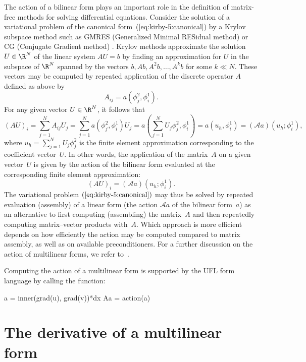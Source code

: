 The action of a bilinear form plays an important role in the
definition of matrix-free methods for solving differential
equations. Consider the solution of a variational problem of the
canonical form~(\ref{eq:kirby-5:canonical}) by a Krylov subspace
method such as GMRES (Generalized Minimal RESidual
method) \citep{SaadSchultz1986} or CG (Conjugate Gradient
method) \citep{HestenesStiefel1952}. Krylov methods approximate the
solution $U\in\R^N$ of the linear system $AU=b$ by finding an
approximation for $U$ in the subspace of $\R^N$ spanned by the vectors
$b, Ab, A^2b, \ldots, A^kb$ for some $k \ll N$. These vectors may be
computed by repeated application of the discrete operator $A$ defined
as above by
\begin{equation}
  A_{ij} = a(\phi^2_j, \phi^1_i).
\end{equation}
For any given vector $U \in \R^N$, it follows that
\begin{equation}
  (A U)_i = \sum_{j=1}^N A_{ij} U_j
  = \sum_{j=1}^N a(\phi^2_j, \phi^1_i) U_j
  = a\left(\sum_{j=1}^N U_j \phi^2_j, \phi^1_i \right)
  = a(u_h, \phi^1_i) = (\mathcal{A} a) (u_h; \phi^1_i),
\end{equation}
where $u_h = \sum_{j=1}^N U_j \phi^2_j$ is the finite element
approximation corresponding to the coefficient vector~$U$.  In other
words, the application of the matrix~$A$ on a given vector~$U$ is
given by the action of the bilinear form evaluated at the
corresponding finite element approximation:
\begin{equation}
  (A U)_i = (\mathcal{A} a) (u_h; \phi^1_i).
\end{equation}
The variational problem $(\ref{eq:kirby-5:canonical})$ may thus be
solved by repeated evaluation (assembly) of a linear form (the action
$\mathcal{A} a$ of the bilinear form~$a$) as an alternative to first
computing (assembling) the matrix~$A$ and then repeatedly computing
matrix--vector products with~$A$. Which approach is more efficient
depends on how efficiently the action may be computed compared to
matrix assembly, as well as on available preconditioners. For a
further discussion on the action of multilinear forms, we refer
to~\citet{BagheriScott2004}.

Computing the action of a multilinear form is supported by the UFL
form language by calling the  function:
\begin{python}
  a  = inner(grad(u), grad(v))*dx
  Aa = action(a)
\end{python}

\section{The derivative of a multilinear form}

